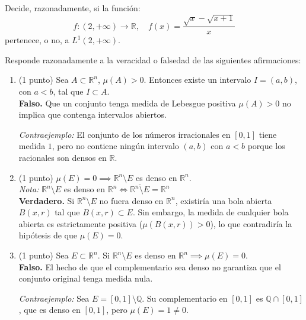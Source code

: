 \documentclass[12pt]{article}
\begin{document}
    \begin{ejercicio}[3 puntos]
        Decide, razonadamente, si la función:
        $$ f: (2, +\infty) \rightarrow \mathbb{R}, \quad f(x) = \frac{\sqrt{x} - \sqrt{x+1}}{x} $$
        pertenece, o no, a $L^1(2, +\infty)$.
    \end{ejercicio}
    
    \newpage
	\setcounter{ejercicio}{0}

    \begin{ejercicio}
        Responde razonadamente a la veracidad o falsedad de las siguientes afirmaciones:
        \begin{enumerate}
            \item (1 punto) Sea $A \subset \mathbb{R}^n$, $\mu(A) > 0$. Entonces existe un intervalo $I = (a, b)$, con $a < b$, tal que $I \subset A$. \\
            \textbf{Falso.} Que un conjunto tenga medida de Lebesgue positiva $\mu(A) > 0$ no implica que contenga intervalos abiertos. 
            
            \textit{Contraejemplo:} El conjunto de los números irracionales en $[0, 1]$ tiene medida $1$, pero no contiene ningún intervalo $(a, b)$ con $a < b$ porque los racionales son densos en $\mathbb{R}$.
            
            \item (1 punto) $\mu(E) = 0 \implies \mathbb{R}^n \setminus E$ es denso en $\mathbb{R}^n$. \\
            \textit{Nota:} $\mathbb{R}^n \setminus E$ es denso en $\mathbb{R}^n \iff \overline{\mathbb{R}^n \setminus E} = \mathbb{R}^n$ \\
            \textbf{Verdadero.} Si $\mathbb{R}^n \setminus E$ no fuera denso en $\mathbb{R}^n$, existiría una bola abierta $B(x, r)$ tal que $B(x, r) \subset E$. Sin embargo, la medida de cualquier bola abierta es estrictamente positiva ($\mu(B(x, r)) > 0$), lo que contradiría la hipótesis de que $\mu(E) = 0$.
            
            \item (1 punto) Sea $E \subset \mathbb{R}^n$. Si $\mathbb{R}^n \setminus E$ es denso en $\mathbb{R}^n \implies \mu(E) = 0$. \\
            \textbf{Falso.} El hecho de que el complementario sea denso no garantiza que el conjunto original tenga medida nula.
            
            \textit{Contraejemplo:} Sea $E = [0, 1] \setminus \mathbb{Q}$. Su complementario en $[0, 1]$ es $\mathbb{Q} \cap [0, 1]$, que es denso en $[0, 1]$, pero $\mu(E) = 1 \neq 0$.
            

\end{enumerate}
\end{ejercicio}
\end{document}

